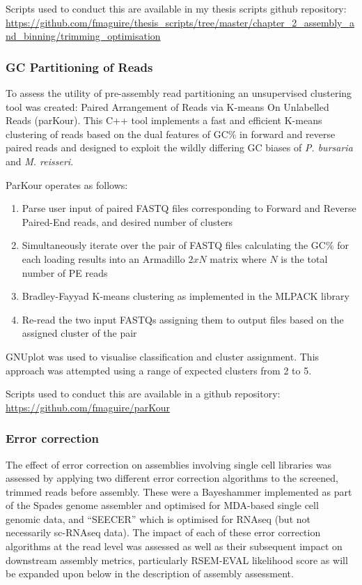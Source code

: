 Scripts used to conduct this are available in my thesis scripts github repository:
\url{https://github.com/fmaguire/thesis_scripts/tree/master/chapter_2_assembly_and_binning/trimming_optimisation}

\subsubsection{GC Partitioning of Reads}

To assess the utility of pre-assembly read partitioning an unsupervised clustering tool was created:
Paired Arrangement of Reads via K-means On Unlabelled Reads (parKour).
This C++ tool implements a fast and efficient K-means clustering of reads based on the dual features
of GC\% in forward and reverse paired reads and designed to exploit the wildly differing GC
biases of \textit{P. bursaria} and \textit{M. reisseri}.

ParKour operates as follows:
\begin{enumerate}
    \item Parse user input of paired FASTQ files corresponding to Forward and Reverse Paired-End reads, and desired number of clusters
    \item Simultaneously iterate over the pair of FASTQ files calculating the GC\% for each loading results into an Armadillo \(2xN\) matrix \citep{Sanderson2010} where \(N\) is the total number of PE reads
    \item Bradley-Fayyad K-means \citep{Bradley1998} clustering as implemented in the MLPACK library \citep{mlpack2013}
    \item Re-read the two input FASTQs assigning them to output files based on the assigned cluster of the pair
\end{enumerate}

GNUplot \citep{Gnuplot44} was used to visualise classification and cluster assignment.
This approach was attempted using a range of expected clusters from 2 to 5.

Scripts used to conduct this are available in a github repository:
\url{https://github.com/fmaguire/parKour}

\subsubsection{Error correction}

The effect of error correction on assemblies involving single cell libraries was assessed 
by applying two different error correction algorithms to the screened, trimmed reads before assembly.
These were a Bayeshammer \citep{Nikolenko2013} implemented as part of the Spades 
genome assembler \citep{Bankevich2012} and optimised for MDA-based single cell genomic data, 
and ``SEECER'' \citep{Le2013} which is optimised for RNAseq (but not necessarily sc-RNAseq
data). 
The impact of each of these error correction algorithms at the read level was assessed as well 
as their subsequent impact on downstream assembly metrics, particularly RSEM-EVAL likelihood score
as will be expanded upon below in the description of assembly assessment.

